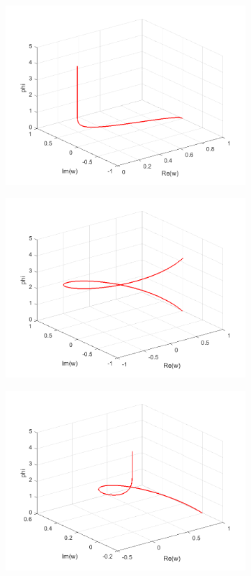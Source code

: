 \documentclass[a4paper,11pt]{article}
\begin{document}
\begin{figure}[!h]
\begin{subfigure}[c]{0.3\textwidth}
\includegraphics[width=\linewidth]{plot7_musg12.png}
\end{subfigure}
\begin{subfigure}[c]{0.3\textwidth}
\includegraphics[width=\linewidth]{plot7_musg20.png}
\end{subfigure}
\begin{subfigure}[c]{0.3\textwidth}
\includegraphics[width=\linewidth]{plot7_musg21.png}

\end{subfigure}
\end{figure}
\end{document}
